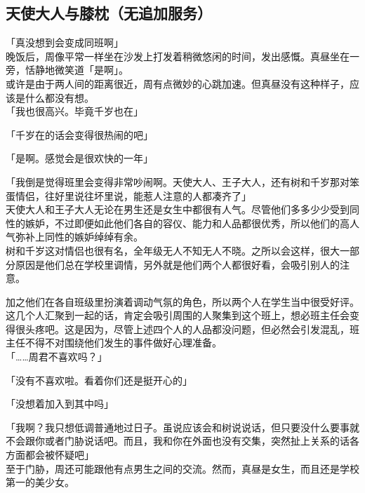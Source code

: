 \subsection{天使大人与膝枕（无追加服务）}

「真没想到会变成同班啊」\\

晚饭后，周像平常一样坐在沙发上打发着稍微悠闲的时间，发出感慨。真昼坐在一旁，恬静地微笑道「是啊」。\\

或许是由于两人间的距离很近，周有点微妙的心跳加速。但真昼没有这种样子，应该是什么都没有想。\\%

「我也很高兴。毕竟千岁也在」

「千岁在的话会变得很热闹的吧」

「是啊。感觉会是很欢快的一年」

「我倒是觉得班里会变得非常吵闹啊。天使大人、王子大人，还有树和千岁那对笨蛋情侣，往好里说往坏里说，能惹人注意的人都凑齐了」\\

天使大人和王子大人无论在男生还是女生中都很有人气。尽管他们多多少少受到同性的嫉妒，不过即便如此他们各自的容仪、能力和人品都很优秀，所以他们的高人气弥补上同性的嫉妒绰绰有余。\\

树和千岁这对情侣也很有名，全年级无人不知无人不晓。之所以会这样，很大一部分原因是他们总在学校里调情，另外就是他们两个人都很好看，会吸引别人的注意。

加之他们在各自班级里扮演着调动气氛的角色，所以两个人在学生当中很受好评。\\

这几个人汇聚到一起的话，肯定会吸引周围的人聚集到这个班上，想必班主任会变得很头疼吧。这是因为，尽管上述四个人的人品都没问题，但必然会引发混乱，班主任不得不对围绕他们发生的事件做好心理准备。\\

「……周君不喜欢吗？」

「没有不喜欢啦。看着你们还是挺开心的」

「没想着加入到其中吗」

「我啊？我只想低调普通地过日子。虽说应该会和树说说话，但只要没什么要事就不会跟你或者门胁说话吧。而且，我和你在外面也没有交集，突然扯上关系的话各方面都会被怀疑吧」\\

至于门胁，周还可能跟他有点男生之间的交流。然而，真昼是女生，而且还是学校第一的美少女。

